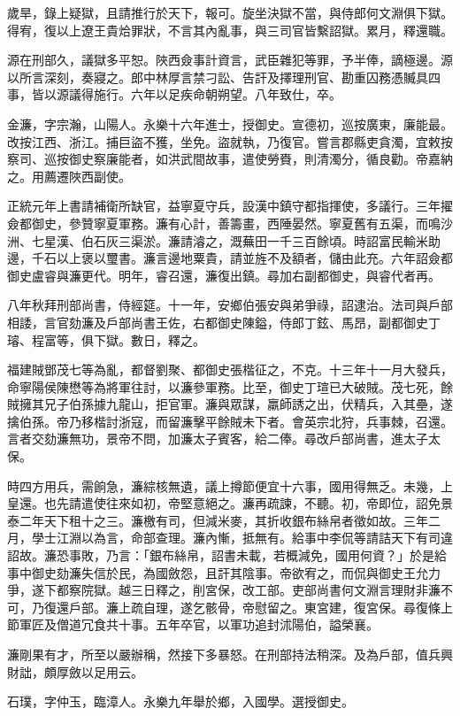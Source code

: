 \begin{pinyinscope}
歲旱，錄上疑獄，且請推行於天下，報可。旋坐決獄不當，與侍郎何文淵俱下獄。得宥，復以上遼王貴烚罪狀，不言其內亂事，與三司官皆繫詔獄。累月，釋還職。

源在刑部久，議獄多平恕。陜西僉事計資言，武臣雜犯等罪，予半俸，謫極邊。源以所言深刻，奏寢之。郎中林厚言禁刁訟、告訐及擇理刑官、勘重囚務憑贓具四事，皆以源議得施行。六年以足疾命朝朔望。八年致仕，卒。

金濂，字宗瀚，山陽人。永樂十六年進士，授御史。宣德初，巡按廣東，廉能最。改按江西、浙江。捕巨盜不獲，坐免。盜就執，乃復官。嘗言郡縣吏貪濁，宜敕按察司、巡按御史察廉能者，如洪武間故事，遣使勞賚，則清濁分，循良勸。帝嘉納之。用薦遷陜西副使。

正統元年上書請補衛所缺官，益寧夏守兵，設漢中鎮守都指揮使，多議行。三年擢僉都御史，參贊寧夏軍務。濂有心計，善籌畫，西陲晏然。寧夏舊有五渠，而鳴沙洲、七星漢、伯石灰三渠淤。濂請濬之，溉蕪田一千三百餘頃。時詔富民輸米助邊，千石以上褒以璽書。濂言邊地粟貴，請並旌不及額者，儲由此充。六年詔僉都御史盧睿與濂更代。明年，睿召還，濂復出鎮。尋加右副都御史，與睿代者再。

八年秋拜刑部尚書，侍經筵。十一年，安鄉伯張安與弟爭祿，詔逮治。法司與戶部相諉，言官劾濂及戶部尚書王佐，右都御史陳鎰，侍郎丁鉉、馬昂，副都御史丁璿、程富等，俱下獄。數日，釋之。

福建賊鄧茂七等為亂，都督劉聚、都御史張楷征之，不克。十三年十一月大發兵，命寧陽侯陳懋等為將軍往討，以濂參軍務。比至，御史丁瑄已大破賊。茂七死，餘賊擁其兄子伯孫據九龍山，拒官軍。濂與眾謀，羸師誘之出，伏精兵，入其壘，遂擒伯孫。帝乃移楷討浙寇，而留濂擊平餘賊未下者。會英宗北狩，兵事棘，召還。言者交劾濂無功，景帝不問，加濂太子賓客，給二俸。尋改戶部尚書，進太子太保。

時四方用兵，需餉急，濂綜核無遺，議上撙節便宜十六事，國用得無乏。未幾，上皇還。也先請遣使往來如初，帝堅意絕之。濂再疏諫，不聽。初，帝即位，詔免景泰二年天下租十之三。濂檄有司，但減米麥，其折收銀布絲帛者徵如故。三年二月，學士江淵以為言，命部查理。濂內慚，抵無有。給事中李侃等請詰天下有司違詔故。濂恐事敗，乃言：「銀布絲帛，詔書未載，若概減免，國用何資？」於是給事中御史劾濂失信於民，為國斂怨，且訐其陰事。帝欲宥之，而侃與御史王允力爭，遂下都察院獄。越三日釋之，削宮保，改工部。吏部尚書何文淵言理財非濂不可，乃復還戶部。濂上疏自理，遂乞骸骨，帝慰留之。東宮建，復宮保。尋復條上節軍匠及僧道冗食共十事。五年卒官，以軍功追封沭陽伯，謚榮襄。

濂剛果有才，所至以嚴辦稱，然接下多暴怒。在刑部持法稍深。及為戶部，值兵興財詘，頗厚斂以足用云。

石璞，字仲玉，臨漳人。永樂九年舉於鄉，入國學。選授御史。


\end{pinyinscope}
